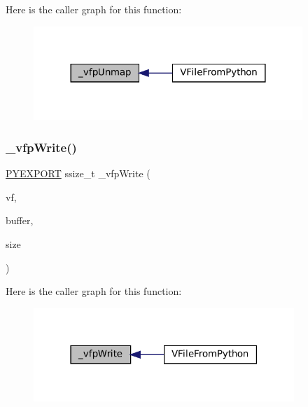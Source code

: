 Here is the caller graph for this function\+:
\nopagebreak
\begin{figure}[H]
\begin{center}
\leavevmode
\includegraphics[width=288pt]{vfs-py_8h_a8e07b0e17503c8a4d583587cdf5864f5_icgraph}
\end{center}
\end{figure}
\mbox{\label{vfs-py_8h_a1f6b6c31b8f6b50179ba3f7030dc8f55}} 
\subsubsection{\texorpdfstring{\+\_\+vfp\+Write()}{\_vfpWrite()}}
{\footnotesize\ttfamily \mbox{\hyperlink{pycommon_8h_a68eebefd6b08dcf3f0bc2b2fe43a32b6}{P\+Y\+E\+X\+P\+O\+RT}} ssize\+\_\+t \+\_\+vfp\+Write (\begin{DoxyParamCaption}\item[{struct V\+File $\ast$}]{vf,  }\item[{const void $\ast$}]{buffer,  }\item[{size\+\_\+t}]{size }\end{DoxyParamCaption})}

Here is the caller graph for this function\+:
\nopagebreak
\begin{figure}[H]
\begin{center}
\leavevmode
\includegraphics[width=279pt]{vfs-py_8h_a1f6b6c31b8f6b50179ba3f7030dc8f55_icgraph}
\end{center}
\end{figure}
\mbox{\label{vfs-py_8h_a2c8828e68e769f2b3de7641e6d12feea}} 
